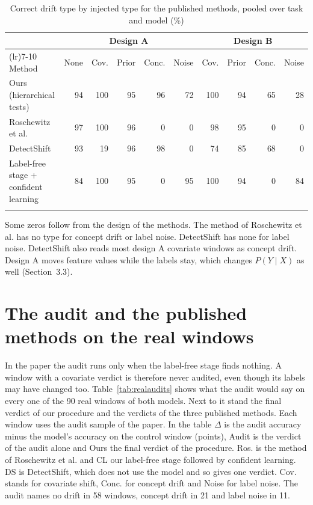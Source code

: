 \documentclass[pdflatex,sn-basic]{sn-jnl}
\begin{document}
\begin{table}[!htbp]\centering\tablebodyfont
\caption{Correct drift type by injected type for the published methods, pooled over task and model (\%)}\label{tab:publishedtypes}%
\setlength{\tabcolsep}{4pt}
\begin{tabularx}{\textwidth}{@{}>{\raggedright\arraybackslash}Xrrrrrrrrr@{}}
\toprule
 & \multicolumn{5}{c}{Design A} & \multicolumn{4}{c}{Design B} \\
\cmidrule(lr){2-6}
\cmidrule(lr){7-10}
Method & \multicolumn{1}{c}{None} & \multicolumn{1}{c}{Cov.} & \multicolumn{1}{c}{Prior} & \multicolumn{1}{c}{Conc.} & \multicolumn{1}{c}{Noise} & \multicolumn{1}{c}{Cov.} & \multicolumn{1}{c}{Prior} & \multicolumn{1}{c}{Conc.} & \multicolumn{1}{c}{Noise} \\
\midrule
Ours (hierarchical tests) & 94 & 100 & 95 & 96 & 72 & 100 & 94 & 65 & 28 \\
Roschewitz et al. & 97 & 100 & 96 & 0 & 0 & 98 & 95 & 0 & 0 \\
DetectShift & 93 & 19 & 96 & 98 & 0 & 74 & 85 & 68 & 0 \\
Label-free stage + confident learning & 84 & 100 & 95 & 0 & 95 & 100 & 94 & 0 & 84 \\
\botrule
\end{tabularx}
\end{table}

Some zeros follow from the design of the methods. The method of Roschewitz et al. has no type for concept drift or label noise. DetectShift has none for label noise. DetectShift also reads most design A covariate windows as concept drift. Design A moves feature values while the labels stay, which changes $P(Y\mid X)$ as well (Section~3.3).

\section{The audit and the published methods on the real windows}\label{sec:realaudits}

In the paper the audit runs only when the label-free stage finds nothing. A window with a covariate verdict is therefore never audited, even though its labels may have changed too. Table~\ref{tab:realaudits} shows what the audit would say on every one of the 90 real windows of both models. Next to it stand the final verdict of our procedure and the verdicts of the three published methods. Each window uses the audit sample of the paper. In the table $\Delta$ is the audit accuracy minus the model's accuracy on the control window (points), Audit is the verdict of the audit alone and Ours the final verdict of the procedure. Ros. is the method of Roschewitz et al. and CL our label-free stage followed by confident learning. DS is DetectShift, which does not use the model and so gives one verdict. Cov. stands for covariate shift, Conc. for concept drift and Noise for label noise. The audit names no drift in 58 windows, concept drift in 21 and label noise in 11.
\end{document}
